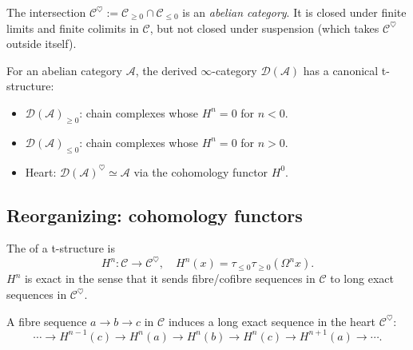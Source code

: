\begin{theorem}
\label{thm:heart}
The intersection $\mathcal{C}^\heartsuit := \mathcal{C}_{\geq 0} \cap
\mathcal{C}_{\leq 0}$ is an \emph{abelian category}. It is closed under
finite limits and finite colimits in $\mathcal{C}$, but not closed under
suspension (which takes $\mathcal{C}^\heartsuit$ outside itself).
\end{theorem}

\begin{example_thm}
\label{ex:standard-t-D}
For an abelian category $\mathcal{A}$, the derived $\infty$-category
$\mathcal{D}(\mathcal{A})$ has a canonical t-structure:
\begin{itemize}
  \item $\mathcal{D}(\mathcal{A})_{\geq 0}$: chain complexes whose
        $H^n = 0$ for $n < 0$.
  \item $\mathcal{D}(\mathcal{A})_{\leq 0}$: chain complexes whose
        $H^n = 0$ for $n > 0$.
  \item Heart: $\mathcal{D}(\mathcal{A})^\heartsuit \simeq \mathcal{A}$ via
        the cohomology functor $H^0$.
\end{itemize}
\end{example_thm}

\subsection{Reorganizing: cohomology functors}

\begin{definition}
\label{def:cohomology}
The  of a t-structure is
\begin{equation*}
  H^n : \mathcal{C} \to \mathcal{C}^\heartsuit, \quad
  H^n(x) = \tau_{\leq 0} \tau_{\geq 0} (\Omega^n x).
\end{equation*}
$H^n$ is exact in the sense that it sends fibre/cofibre sequences in
$\mathcal{C}$ to long exact sequences in $\mathcal{C}^\heartsuit$.
\end{definition}

\begin{theorem}
\label{thm:LES-cohomology}
A fibre sequence $a \to b \to c$ in $\mathcal{C}$ induces a long exact
sequence in the heart $\mathcal{C}^\heartsuit$:
\begin{equation*}
  \cdots \to H^{n-1}(c) \to H^n(a) \to H^n(b) \to H^n(c) \to H^{n+1}(a) \to \cdots.
\end{equation*}
\end{theorem}


